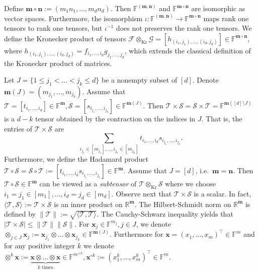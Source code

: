 \documentclass{amsart}
\newcommand{\F}{\mathbb{F}}
\newcommand{\R}{\mathbb{R}}
\newcommand{\m}{\mathbf{m}}
\newcommand{\n}{\mathbf{n}}
\newcommand{\x}{\mathbf{x}}
\newcommand{\0}{\mathbf{0}}
\newcommand{\1}{\mathbf{1}}
\newcommand{\cF}{\mathcal{F}}
\newcommand{\cG}{\mathcal{G}}
\newcommand{\cS}{\mathcal{S}}
\newcommand{\cT}{\mathcal{T}}
\newcommand{\lan}{\langle}
\newcommand{\ran}{\rangle}
\newcommand{\an}[1]{\lan#1\ran}
\newcommand{\Kron}{\mathop{\mathrm{Kr}}\nolimits}
\newcommand{\trans}{^\top}
\theoremstyle{remark}
\numberwithin{equation}{section} %
\renewcommand{\le}{\leqslant}
\begin{document}
Define $\m\circ\n:=(m_1n_1,\ldots,m_dn_d)$.
 Then $\F^{(\m,\n)}$ and $\F^{\m\circ\n}$ are isomorphic as vector spaces.  Furthermore, the isomorphism $\iota:\F^{(\m,\n)}\to\F^{\m\circ\n}$
 maps rank one tensors to rank one tensors, but $\iota^{-1}$ does not preserves the rank one tensors.  
%
We define the Kronecker product of tensors $\cF\otimes_{\Kron}\cG=[h_{(i_1,j_1),\ldots,(i_d,j_d)}]\in \F^{\m\circ\n}$, where $h_{(i_1,j_1),\ldots,(i_d,j_d)}=f_{i_1,\ldots,i_d}g_{j_1,\ldots,j_d}$, which extends the classical definition of the Kronecker product of matrices.

 Let $J=\{1\le j_1<\ldots<j_k\le d\}$ be a nonempty subset of $[d]$.  Denote $\m(J)=(m_{j_1},\ldots,m_{j_k})$.
 Assume that $\cT=[t_{i_1,\ldots,i_d}]\in\F^\m,\cS=[s_{i_{j_1},\ldots,i_{j_k}}]\in\F^{\m(J)}$.
 Then $\cT\times \cS=\cS\times \cT=\F^{\m([d]\setminus J)}$ is a $d-k$ tensor obtained by the contraction on the indices
 in $J$.  That is, the entries of $\cT\times \cS$ are
 \[\sum_{i_{j_1}\in [m_{j_1}],\ldots, i_{j_k}\in[m_{j_k}]} t_{i_1,\ldots,i_d} s_{i_{j_1} ,\ldots,i_{j_k}}.\]
 Furthermore, we define the Hadamard product $\cT\circ \cS=\cS\circ\cT:=[t_{i_1,\ldots,i_d} s_{i_{j_1},\ldots,i_{j_k}}]\in \F^\m$.
 Assume that $J=[d]$, i.e.\ $\m=\n$.  Then $\cT\circ \cS\in\F^{\m}$ can be viewed as a \emph{subtensor} of $\cT\otimes_{\Kron}\cS$
 where we choose $i_1=j_1\in [m_1],\ldots,i_d=j_d\in [m_d]$.
 Observe next that $\cT\times\cS$ is a scalar.  In fact, $\an{\cT,\cS}:=\cT\times \cS$ is an inner product on $\R^\m$.
%
The Hilbert-Schmidt norm on $\R^\m$ is defined by
 $\|\cT\|:=\sqrt{\an{\cT,\cT}}$.  The Cauchy-Schwarz inequality yields that $|\cT\times \cS|\le \|\cT\| \|\cS\|$.
%
 For $\x_j\in \F^{m_j}, j\in J$, we denote $\otimes_{j\in J} \x_j:=\x_{j_1}\otimes\dots\otimes \x_{j_k}\in \F^{\m(J)}$.
 Furthermore for $\x=(x_1,\ldots,x_m)\trans\in \F^m$ and for any positive integer $k$ we denote $\otimes^k {\x}:=\underbrace{{\x}\otimes\dots\otimes{\x}}_{k\;\text{times}}\in \F^{m^{\times k}}, \x^{\circ k}:=(x_1^k,\ldots,x_m^k)\trans\in \F^m$.
\end{document}

